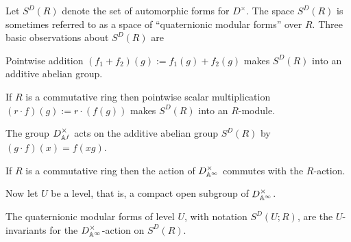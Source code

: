 Let $S^D(R)$ denote the set of automorphic forms for $D^\times$. The space $S^D(R)$ is sometimes referred to as a space of
``quaternionic modular forms'' over $R$.
Three basic observations about $S^D(R)$ are

\begin{definition}
  \label{TotallyDefiniteQuaternionAlgebra.WeightTwoAutomorphicForm.addCommGroup}
  \leanok
  Pointwise addition $(f_1+f_2)(g):=f_1(g)+f_2(g)$ makes $S^D(R)$ into an
  additive abelian group.
\end{definition}

\begin{definition}
  \label{TotallyDefiniteQuaternionAlgebra.WeightTwoAutomorphicForm.module}
  \leanok
  If $R$ is a commutative ring then pointwise scalar multiplication $(r\cdot f)(g):= r\cdot(f(g))$ makes
  $S^D(R)$ into an $R$-module.
\end{definition}

\begin{definition}
  \label{TotallyDefiniteQuaternionAlgebra.WeightTwoAutomorphicForm.distribMulAction}
  \leanok
  The group $D_{\mathbb{A}^f}^\times$ acts on the additive abelian group $S^D(R)$ by $(g\cdot f)(x)=f(xg)$.
\end{definition}

If $R$ is a commutative ring then the action of $D_{\mathbb{A}^\infty}^\times$ commutes with the $R$-action.

Now let $U$ be a level, that is, a compact open subgroup of $D_{\mathbb{A}^\infty}^\times$.

\begin{definition}
  \label{TotallyDefiniteQuaternionAlgebra.WeightTwoAutomorphicFormOfLevel}
  \leanok
  The quaternionic modular forms of level $U$, with notation $S^D(U;R)$, are the $U$-invariants for the $D_{\mathbb{A}^\infty}^\times$-action on $S^D(R)$.
\end{definition}

